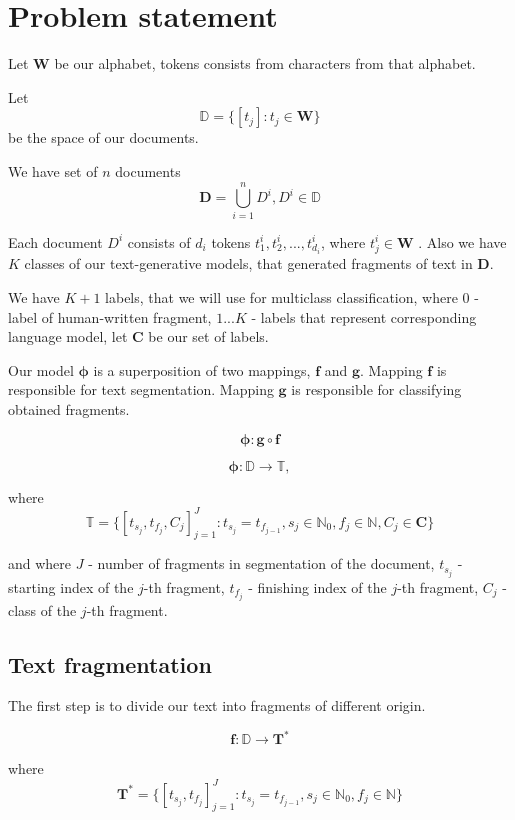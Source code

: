 \documentclass{article}
\begin{document}
\section{Problem statement}

Let $\mathbf{W}$ be our alphabet, tokens consists from characters from that alphabet.

Let $$\mathbb{D} = \{[t_j] : t_j \in \mathbf{W}\}$$ be the space of our documents.

We have set of $n$ documents
$$\mathbf{D} = \bigcup_{i=1}^{n}D^i, D^i \in \mathbb{D}$$

Each document  $D^i$ consists of $d_i$ tokens $t_1^i, t_2^i, ..., t_{d_i}^i$, where $t_j^i \in \mathbf{W}$ . Also we have $K$ classes of our text-generative models, that generated fragments of text in $\mathbf{D}$.

We have $K + 1$ labels, that we will use for multiclass classification, where $0$ - label of human-written fragment, ${1...K}$ - labels that represent corresponding language model, let $\mathbf{C}$ be our set of labels.

Our model $\mathbf{\phi}$ is a superposition of two mappings, $\mathbf{f}$ and $\mathbf{g}$. Mapping $\mathbf{f}$ is responsible for text segmentation. Mapping $\mathbf{g}$ is responsible for classifying obtained fragments.

$$\mathbf{\phi} : \mathbf{g} \circ \mathbf{f}$$


$$\mathbf{\phi}: \mathbb{D} \rightarrow \mathbb{T},$$

where $$\mathbb{T} = \{[t_{s_j}, t_{f_j}, C_j]_{j = 1}^{J} : t_{s_j} = t_{f_{j - 1}}, s_j \in \mathbb{N}_0, f_j \in \mathbb{N}, C_j \in \mathbf{C}\}$$

and where $J$ - number of fragments in segmentation of the document, $t_{s_j}$ - starting index of the $j$-th fragment,  $t_{f_j}$ - finishing index of the $j$-th fragment,  $C_{j}$ - class of the $j$-th fragment.



\subsection{Text fragmentation}
The first step is to divide our text into fragments of different origin.

$$\mathbf{f}: \mathbb{D} \rightarrow \mathbf{T}^*$$

where $$\mathbf{T}^* = \{[t_{s_j}, t_{f_j}]_{j = 1}^{J} : t_{s_j} = t_{f_{j - 1}}, s_j \in \mathbb{N}_0, f_j \in \mathbb{N}\}$$
\end{document}
